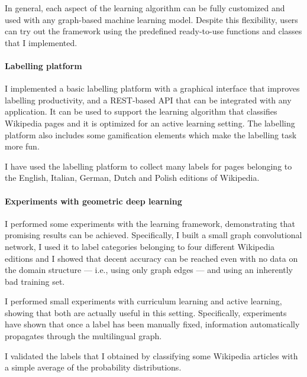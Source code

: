             In general, each aspect of the learning algorithm can be fully customized and used with any graph-based machine learning model. Despite this flexibility, users can try out the framework using the predefined ready-to-use functions and classes that I implemented.
        \paragraph{Labelling platform}
            I implemented a basic labelling platform with a graphical interface that improves labelling productivity, and a REST-based API that can be integrated with any application. It can be used to support the learning algorithm that classifies Wikipedia pages and it is optimized for an active learning setting. The labelling platform also includes some gamification elements which make the labelling task more fun.
            
            I have used the labelling platform to collect many labels for pages belonging to the English, Italian, German, Dutch and Polish editions of Wikipedia.
        \paragraph{Experiments with geometric deep learning}
            I performed some experiments with the learning framework, demonstrating that promising results can be achieved. Specifically, I built a small graph convolutional network, I used it to label categories belonging to four different Wikipedia editions and I showed that decent accuracy can be reached even with no data on the domain structure --- i.e., using only graph edges --- and using an inherently bad training set.
            
            I performed small experiments with curriculum learning and active learning, showing that both are actually useful in this setting. Specifically, experiments have shown that once a label has been manually fixed, information automatically propagates through the multilingual graph.
            
            I validated the labels that I obtained by classifying some Wikipedia articles with a simple average of the probability distributions.

